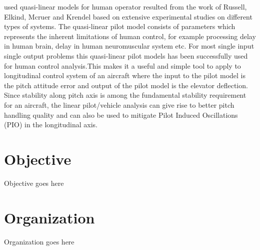 used quasi-linear models for  human operator resulted from the work of Russell, Elkind, Mcruer and Krendel\cite{hess1990control} based on extensive experimental studies on different types of systems. The quasi-linear pilot model consists of parameters which represents the inherent limitations of human control, for example processing delay in human brain, delay in 
human neuromuscular system etc. For most single input single output problems this quasi-linear pilot models has been successfully used for human control analysis\cite{pool2009pilot}\cite{taylor1967comparison}\cite{ninz1982parametric}.This  makes  it  a  useful  and  simple  tool  to  apply  to longitudinal control system of an aircraft where the input to the pilot model is the pitch  attitude  error and output of the  pilot  model  is  the  elevator  deflection.  Since  stability  along  pitch  axis  is  among  the  fundamental  stability 
requirement for an aircraft, the linear pilot/vehicle analysis can give rise to better pitch handling quality and can also be used to mitigate Pilot Induced Oscillations (PIO) in the longitudinal axis.

\section{Objective}

Objective goes here


\section{Organization}
Organization goes here

